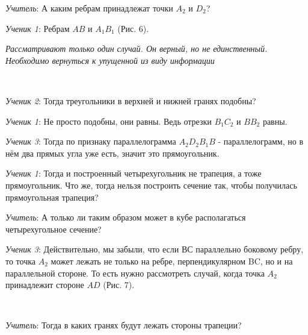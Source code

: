 \documentclass[a4paper,14pt,russian]{extreport}
\newcommand{\capt}[1]{%
    \\[8pt]
    \text{Рис. #1}
}
\begin{document}
\textit{Учитель}: А каким ребрам принадлежат точки $A_2$ и $D_2$?

\textit{Ученик 1}:  Ребрам $AB$ и $A_1B_1$ (Рис. 6).

\textit{Рассматривают только один случай. Он верный, но не единственный. Необходимо вернуться к упущенной из виду информации}

 \begin{center}
    \begin{minipage}{0.3\textwidth}
        \centering
    \end{minipage}
    \capt{6}
\end{center}

\textit{Ученик 2}: Тогда треугольники в верхней и нижней гранях подобны?

\textit{Ученик 1}: Не просто подобны, они равны. Ведь отрезки $B_1C_2$ и $BB_2$ равны.

\textit{Ученик 3}: Тогда по признаку параллелограмма $A_2D_2B_1B$ - параллелограмм, но в нём два прямых угла уже есть, значит это прямоугольник.

\textit{Ученик 1}: Тогда и построенный четырехугольник не трапеция, а тоже прямоугольник. Что же, тогда нельзя построить сечение так, чтобы получилась прямоугольная трапеция?

\textit{Учитель}: А только ли таким образом может в кубе располагаться четырехугольное сечение?

\textit{Ученик 3}: Действительно, мы забыли, что если $ВС$ параллельно боковому ребру, то точка $A_2$ может лежать не только на ребре, перпендикулярном BC, но и на параллельной стороне. То есть нужно рассмотреть случай, когда точка $A_2$ принадлежит стороне $AD$ (Рис. 7).



 \begin{center}
    \begin{minipage}{0.3\textwidth}
        \centering
    \end{minipage}
    \capt{7}
\end{center}

\textit{Учитель}: Тогда в каких гранях будут лежать стороны трапеции?
\end{document}
